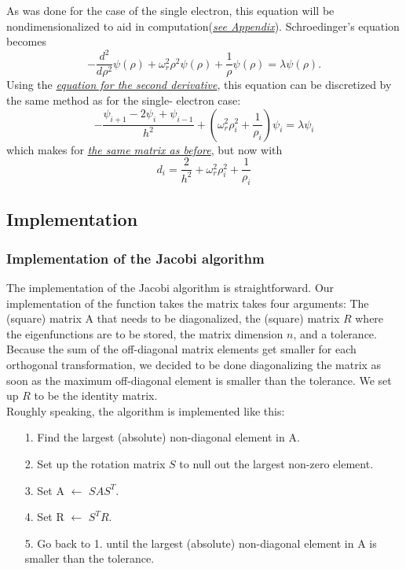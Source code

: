 \documentclass[10pt,a4paper]{article}
\begin{document}
As was done for the case of the single electron, this equation will be nondimensionalized to aid in computation(\hyperref[nondim_2_el]{\emph{see Appendix}}).
Schroedinger's equation becomes
\begin{equation*}
  -\frac{d^2}{d\rho^2} \psi(\rho) + \omega_r^2\rho^2\psi(\rho) +\frac{1}{\rho}\psi(\rho) = \lambda \psi(\rho).
\end{equation*}
Using the \hyperref[2nd derivative]{\emph{equation for the second derivative}}, this equation can be discretized by the same method as for the single- electron case:
\begin{equation*}
-\frac{\psi_{i+1} -2\psi_i +\psi_{i-1}}{h^2}+\left( \omega_r^2 \rho_i^2+\frac{1}{\rho_i}\right)\psi_i= \lambda \psi_i
\end{equation*}
which makes for \hyperref[discrete matrix]{\emph{the same matrix as before}}, but now with
$$
d_i=\frac{2}{h^2}+\omega_r^2\rho_i^2 +\frac{1}{\rho_i}
$$

\subsection{ Implementation}
\subsubsection{Implementation of the Jacobi algorithm}
The implementation of the Jacobi algorithm is straightforward. Our implementation of the function takes the matrix takes four arguments: The (square) matrix A that needs to be diagonalized, the (square) matrix $R$ where the eigenfunctions are to be stored, the matrix dimension $n$, and a tolerance. Because the sum of the off-diagonal matrix elements get smaller for each orthogonal transformation, we decided to be done diagonalizing the matrix as soon as the maximum off-diagonal element is smaller than the tolerance. We set up $R$ to be the identity matrix.\\
Roughly speaking, the algorithm is implemented like this:\\
\begin{itemize}
\item[1.] Find the largest (absolute) non-diagonal element in A.
\item[2.] Set up the rotation matrix  $S$ to null out the largest non-zero element.
\item[3.] Set A  $\leftarrow$ $SAS^T$.
\item[4.] Set R $\leftarrow$ $S^TR$.
\item[5.] Go back to 1. until the largest (absolute) non-diagonal element in A is smaller than the tolerance.
\end{itemize}
\end{document}

